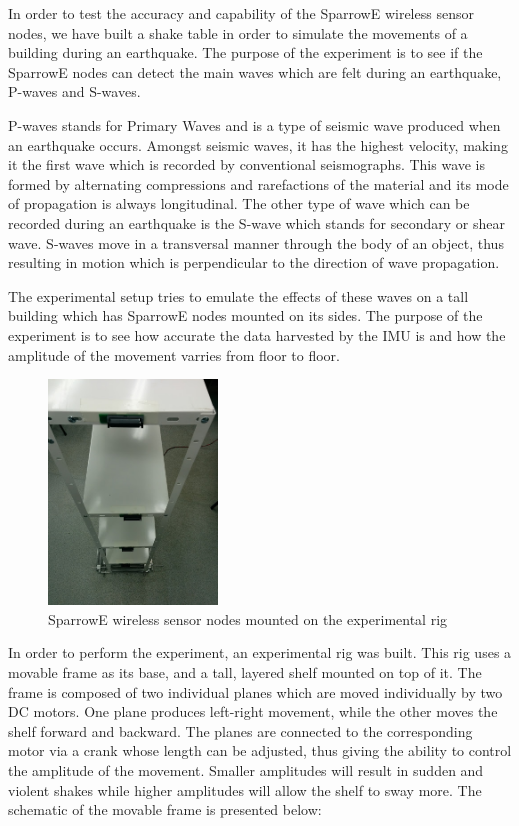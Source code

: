 In order to test the accuracy and capability of the SparrowE wireless sensor nodes, we 
have built a shake table in order to simulate the movements of a building during an earthquake.
The purpose of the experiment is to see if the SparrowE nodes can detect the main waves which 
are felt during an earthquake, P-waves and S-waves.

P-waves stands for Primary Waves and is a type of seismic wave produced when an earthquake occurs.
Amongst seismic waves, it has the highest velocity, making it the first wave which is recorded by 
conventional seismographs. This wave is formed by alternating compressions and rarefactions of the 
material and its mode of propagation is always longitudinal. The other type of wave which can be 
recorded during an earthquake is the S-wave which stands for secondary or shear wave. S-waves move 
in a transversal manner through the body of an object, thus resulting in motion which is perpendicular 
to the direction of wave propagation. 

The experimental setup tries to emulate the effects of these waves on a tall building which has SparrowE 
nodes mounted on its sides. The purpose of the experiment is to see how accurate the data harvested by the 
IMU is and how the amplitude of the movement varries from floor to floor.

\begin{figure}[ht] \centering
  \includegraphics[width=0.4\textwidth]{img/mounted-sparrow-nodes.jpg}
  \caption{SparrowE wireless sensor nodes mounted on the experimental rig}
\end{figure}

In order to perform the experiment, an experimental rig was built. This rig uses a movable frame as its base, 
and a tall, layered shelf mounted on top of it. The frame is composed of two individual planes which are moved 
individually by two DC motors. One plane produces left-right movement, while the other moves the shelf forward and 
backward. The planes are connected to the corresponding motor via a crank whose length can be adjusted, thus giving the 
ability to control the amplitude of the movement. Smaller amplitudes will result in sudden and violent shakes while 
higher amplitudes will allow the shelf to sway more. The schematic of the movable frame is presented below:

